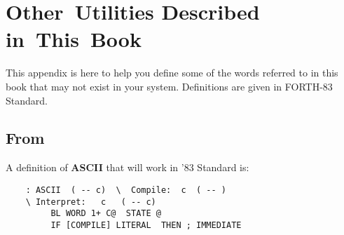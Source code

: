 \chapter{Other~Utilities
Described
in~This~Book}
This appendix is here to help you define some of the words referred to in 
this book that may not exist in your system.  Definitions are given in
FORTH-83 Standard.
\section{From }
A definition of {\bf ASCII} that will work in '83 Standard is:
\begin{verbatim}
    : ASCII  ( -- c)  \  Compile:  c  ( -- )
    \ Interpret:   c   ( -- c)
         BL WORD 1+ C@  STATE @
         IF [COMPILE] LITERAL  THEN ; IMMEDIATE
\end{verbatim}
